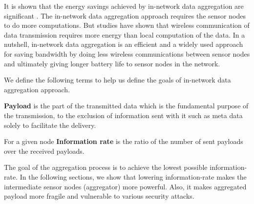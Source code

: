 	It is shown that the energy savings achieved by in-network data aggregation are significant \cite{madden2002tag}.
	The in-network data aggregation approach requires the sensor nodes to do more computations.
	But studies have shown that wireless communication of data transmission requires more energy than local computation of the data. 
	In a nutshell, in-network data aggregation is an efficient and a widely used approach for saving bandwidth by doing less wireless communications between sensor nodes and ultimately giving longer battery life to sensor nodes in the network.

	We define the following terms to help us define the goals of in-network data aggregation approach.
	\begin{definition}\label{def:payload}\cite{PayloadWiKi}
		\textbf{Payload} is the part of the transmitted data which is the fundamental purpose of the transmission, to the exclusion of information sent with it such as meta data solely to facilitate the delivery.
	\end{definition}
	\begin{definition}\label{def:information-rate}
		For a given node \textbf {Information rate} is the ratio of the number of sent payloads over the received payloads.
	\end{definition}
	The goal of the aggregation process is to achieve the lowest possible information-rate.
	In the following sections, we show that lowering information-rate makes the intermediate sensor nodes (aggregator) more powerful.
	Also, it makes aggregated payload more fragile and vulnerable to various security attacks.

